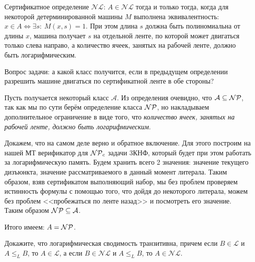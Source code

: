 \documentclass[a4paper,12pt]{article}
\begin{document}
\begin{tasknum}{5}
	Сертификатное определение $\mathcal{NL}$: $A \in \mathcal{NL}$ тогда и только тогда, когда для некоторой детерминированной машины $M$ выполнена эквивалентность: $x \in A \Leftrightarrow \exists s : \ M(x, s) = 1$. При этом длина $s$ должна быть полиномиальна от длины $x$, машина получает $s$ на отдельной ленте, по которой может двигаться только слева направо, а количество ячеек, занятых на рабочей ленте, должно быть логарифмическим.
	
	Вопрос задачи: а какой класс получится, если в предыдущем определении разрешить машине двигаться по сертификатной ленте в обе стороны?
\end{tasknum}

\begin{solution}
	Пусть получается некоторый класс $\mathcal{A}$. Из определения очевидно, что $\mathcal{A} \subseteq \mathcal{NP}$, так как мы по сути берём определение класса $\mathcal{NP}$, но накладываем дополнительное ограничение в виде того, что \textit{количество ячеек, занятых на рабочей ленте, должно быть логарифмическим}. 
	
	Докажем, что на самом деле верно и обратное включение. Для этого построим на нашей МТ верификатор для $\mathcal{NP}_c$ задачи 3КНФ, который будет при этом работать за логарифмическую память. Будем хранить всего 2 значения: значение текущего дизъюнкта, значение рассматриваемого в данный момент литерала. Таким образом, взяв сертификатом выполняющий набор, мы без проблем проверяем истинность формулы с помощью того, что дойдя до некоторого литерала, можем без проблем <<пробежаться по ленте назад>> и посмотреть его значение. Таким образом $\mathcal{NP} \subseteq \mathcal{A}$.
	
	Итого имеем: $A = \mathcal{NP}$.
\end{solution}

\begin{tasknum}{6}
	Докажите, что логарифмическая сводимость транзитивна, причем если $B \in \mathcal{L}$ и $A \leq_L B$, то $A \in \mathcal{L}$, а если $B \in \mathcal{NL}$ и $A \leq_L B$, то $A \in \mathcal{NL}$. 
\end{tasknum}
\end{document}
